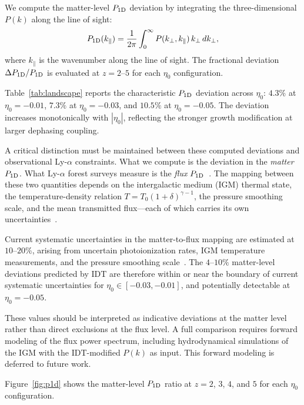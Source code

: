 \documentclass[aps,prd,twocolumn,superscriptaddress,nofootinbib]{revtex4-2}
\begin{document}
We compute the matter-level $P_{1{\rm D}}$ deviation by integrating
the three-dimensional $P(k)$ along the line of sight:
\begin{equation}
P_{1{\rm D}}(k_\parallel) = \frac{1}{2\pi}\int_0^\infty
P(k_\perp, k_\parallel)\,k_\perp\,dk_\perp,
\label{eq:p1d}
\end{equation}
where $k_\parallel$ is the wavenumber along the line of sight. The
fractional deviation $\Delta P_{1{\rm D}}/P_{1{\rm D}}$ is evaluated
at $z = 2$--$5$ for each $\eta_0$ configuration.

Table~\ref{tab:landscape} reports the characteristic $P_{1{\rm D}}$
deviation across $\eta_0$: $4.3\%$ at $\eta_0 = -0.01$, $7.3\%$ at
$\eta_0 = -0.03$, and $10.5\%$ at $\eta_0 = -0.05$. The deviation
increases monotonically with $|\eta_0|$, reflecting the stronger
growth modification at larger dephasing coupling.

A critical distinction must be maintained between these computed
deviations and observational Ly-$\alpha$ constraints. What we
compute is the deviation in the \emph{matter} $P_{1{\rm D}}$. What
Ly-$\alpha$ forest surveys measure is the \emph{flux} $P_{1{\rm
D}}$~\cite{Chabanier2019,PalanqueDelabrouille2020}. The mapping
between these two quantities depends on the intergalactic medium
(IGM) thermal state, the temperature-density relation
$T = T_0(1 + \delta)^{\gamma - 1}$, the pressure smoothing scale,
and the mean transmitted flux---each of which carries its own
uncertainties~\cite{Walther2019}.

Current systematic uncertainties in the matter-to-flux mapping are
estimated at $10$--$20\%$, arising from uncertain photoionization
rates, IGM temperature measurements, and the pressure smoothing
scale~\cite{Chabanier2019,Walther2019}. The $4$--$10\%$ matter-level
deviations predicted by IDT are therefore within or near the
boundary of current systematic uncertainties for $\eta_0 \in [-0.03,
-0.01]$, and potentially detectable at $\eta_0 = -0.05$.

These values should be interpreted as indicative deviations at the
matter level rather than direct exclusions at the flux level. A full
comparison requires forward modeling of the flux power spectrum,
including hydrodynamical simulations of the IGM with the IDT-modified
$P(k)$ as input. This forward modeling is deferred to future work.

Figure~\ref{fig:p1d} shows the matter-level $P_{1{\rm D}}$ ratio at
$z = 2$, $3$, $4$, and $5$ for each $\eta_0$ configuration.
\end{document}
